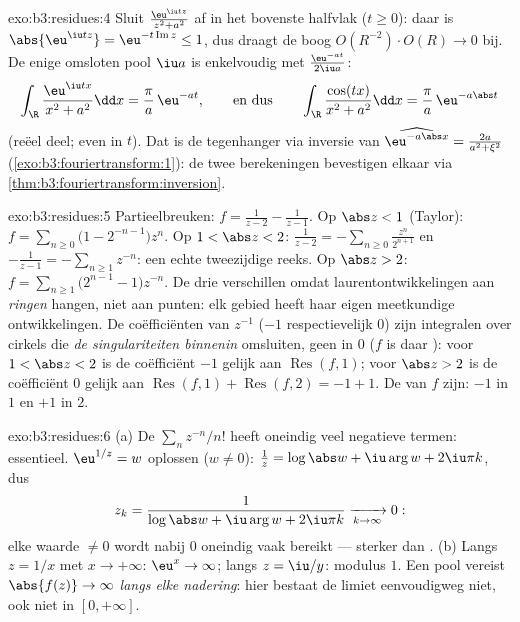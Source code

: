 \begin{solution}{exo:b3:residues:4}
Sluit $\frac{\eu^{\iu tz}}{z^2 + a^2}$ af in het bovenste
halfvlak ($t \geq 0$): daar is $\abs{\eu^{\iu tz}} =
\eu^{-t\operatorname{Im}z} \leq 1$, dus draagt de boog
$O(R^{-2})\cdot O(R) \to 0$ bij. De enige omsloten pool $\iu a$
is enkelvoudig met  $\frac{\eu^{-at}}{2\iu a}$:
\[
\int_\R\frac{\eu^{\iu tx}}{x^2 + a^2}\dd x =
\frac{\pi}{a}\,\eu^{-at},
\qquad\text{en dus}\qquad
\int_\R\frac{\cos(tx)}{x^2+a^2}\dd x = \frac\pi
a\,\eu^{-a\abs t}
\]
(reëel deel; even in $t$). Dat is de tegenhanger via inversie
van $\widehat{\eu^{-a\abs x}} = \frac{2a}{a^2+\xi^2}$
(\cref{exo:b3:fouriertransform:1}): de twee berekeningen
bevestigen elkaar via
\cref{thm:b3:fouriertransform:inversion}.
\end{solution}

\begin{solution}{exo:b3:residues:5}
Partieelbreuken: $f = \frac1{z-2} - \frac1{z-1}$.
Op $\abs z < 1$ (Taylor): $f = \sum_{n\geq0}\bigl(1 -
2^{-n-1}\bigr)z^n$.
Op $1 < \abs z < 2$: $\frac1{z-2} =
-\sum_{n\geq0}\frac{z^n}{2^{n+1}}$ en $-\frac1{z-1} =
-\sum_{n\geq1}z^{-n}$: een echte tweezijdige reeks.
Op $\abs z > 2$: $f = \sum_{n\geq1}\bigl(2^{n-1} -
1\bigr)z^{-n}$. De drie verschillen omdat laurentontwikkelingen
aan \emph{ringen} hangen, niet aan punten: elk gebied heeft haar
eigen meetkundige ontwikkelingen. De coëfficiënten van $z^{-1}$
($-1$ respectievelijk $0$) zijn integralen over cirkels die
\emph{de singulariteiten binnenin} omsluiten, geen  in
$0$ ($f$ is daar ): voor $1 < \abs z < 2$ is de
coëfficiënt $-1$ gelijk aan $\operatorname{Res}(f, 1)$; voor
$\abs z > 2$ is de coëfficiënt $0$ gelijk aan
$\operatorname{Res}(f,1) + \operatorname{Res}(f,2) = -1 + 1$. De
 van $f$ zijn: $-1$ in $1$ en $+1$ in $2$.
\end{solution}

\begin{solution}{exo:b3:residues:6}
(a) De  $\sum_nz^{-n}/n!$ heeft oneindig veel
negatieve termen: essentieel. $\eu^{1/z} = w$ oplossen ($w \neq
0$): $\frac1z = \log\abs w + \iu\arg w + 2\iu\pi k$, dus
\[
z_k = \frac1{\log\abs w + \iu\arg w + 2\iu\pi k}
\xrightarrow[k\to\infty]{} 0 :
\]
elke waarde $\neq 0$ wordt nabij $0$ oneindig vaak bereikt ---
sterker dan .
(b) Langs $z = 1/x$ met $x \to +\infty$: $\eu^x \to \infty$;
langs $z = \iu/y$: modulus $1$. Een pool vereist $\abs{f(z)} \to
\infty$ \emph{langs elke nadering}: hier bestaat de limiet
eenvoudigweg niet, ook niet in $[0, +\infty]$.
\end{solution}

